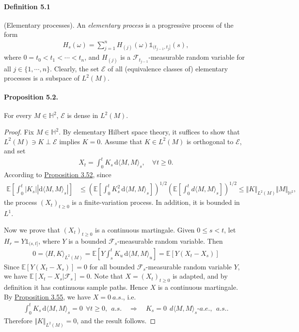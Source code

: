\documentclass{article}
\numberwithin{equation}{section}
\newcommand{\E}{\mathbb{E}}
\renewcommand{\d}{\mathrm{d}}
\theoremstyle{plain}
\theoremstyle{definition}
\begin{document}
\paragraph{Definition 5.1\label{def:5.1}} (Elementary processes). An \textit{elementary process} is a progressive process of the form
\begin{align*}
	H_s(\omega) = \sum_{j=1}^n H_{(j)}(\omega)\mathds{1}_{(t_{j-1},t_j]}(s),
\end{align*}
where $0=t_0<t_1<\cdots<t_n$, and $H_{(j)}$ is a  $\mathscr{F}_{t_{j-1}}$-measurable random variable for all $j\in\{1,\cdots,n\}$. Clearly, the set $\mathscr{E}$ of all (equivalence classes of) elementary processes is a subspace of $L^2(M)$.

\paragraph{Proposition 5.2.\label{prop:5.2}} For every $M\in\mathbb{H}^2$, $\mathscr{E}$ is dense in $L^2(M)$.
\begin{proof}
Fix $M\in\mathbb{H}^2$. By elementary Hilbert space theory, it suffices to show that $L^2(M)\ni K\perp\mathscr{E}$ implies $K=0$. Assume that $K\in L^2(M)$ is orthogonal to $\mathscr{E}$, and set
\begin{align*}
	X_t = \int_0^t K_s\,\d \langle M,M\rangle_s,\quad \forall t\geq 0.
\end{align*}
According to \hyperref[prop:3.52]{Proposition 3.52}, since
\begin{align*}
	\E\left[\int_0^t\vert K_s\vert\left\vert\d\langle M,M\rangle_s\right\vert\right] &\leq \left(\E\left[\int_0^t K_s^2\,\d \langle M,M\rangle_s\right]\right)^{1/2}\left(\E\left[\int_0^t d\langle M,M\rangle_s\right]\right)^{1/2} \leq \left\Vert K\right\Vert_{L^2(M)}\Vert M\Vert_{\mathbb{H}^2},
\end{align*}
the process $(X_t)_{t\geq 0}$ is a finite-variation process. In addition, it is bounded in $L^1$.

Now we prove that $(X_t)_{t\geq 0}$ is a continuous martingale. Given $0\leq s<t$, let $H_r=Y\mathds{1}_{(s,t]}$, where $Y$ is a bounded $\mathscr{F}_s$-measurable random variable. Then
\begin{align*}
	0=\langle H,K\rangle_{L^2(M)}=\E\left[Y\int_s^t K_u\,\d \langle M,M\rangle_u\right] = \E[Y(X_t-X_s)]
\end{align*}
Since $\E[Y(X_t-X_s)]=0$ for all bounded $\mathscr{F}_s$-measurable random variable $Y$, we have $\E[X_t-X_s|\mathscr{F}_s]=0$. Note that $X=(X_t)_{t\geq 0}$ is adapted, and by definition it has continuous sample paths. Hence $X$ is a continuous martingale. By \hyperref[prop:3.55]{Proposition 3.55}, we have $X=0\ a.s.$, i.e.
\begin{align*}
	\int_0^t K_s\,\d \langle M,M\rangle_s = 0\ \ \forall t\geq 0,\ \  a.s.\quad\Rightarrow\quad K_s=0\ \ d\langle M,M\rangle_s\textit{-}a.e.,\ \ a.s..
\end{align*}
Therefore $\Vert K\Vert_{L^2(M)}=0$, and the result follows.
\end{proof}
\end{document}
